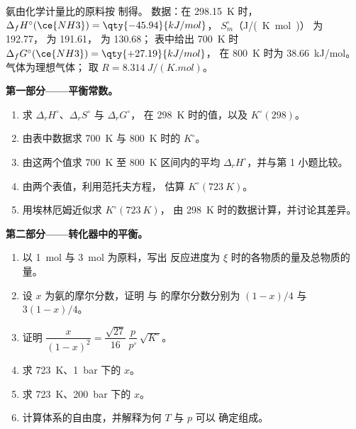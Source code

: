 \begin{problem}
\label{pb:b2:equilibrium-shifts:1}
氨由化学计量比的原料按  制得。
数据：在 \qty{298.15}{K} 时，$\Delta_f H^\circ(\ce{NH3}) = \qty{-45.94}{kJ/mol}$，
$S^\circ_m$（\unit{J/(K.mol)}） 为 192.77， 为 191.61， 为 130.68；
表中给出 \qty{700}{K} 时 $\Delta_f G^\circ(\ce{NH3}) = \qty{+27.19}{kJ/mol}$，
在 \qty{800}{K} 时为 \qty{+38.66}{kJ/mol}。气体为理想气体；
取 $R = \qty{8.314}{J/(K.mol)}$。

\medskip
\noindent\textbf{第一部分——平衡常数。}
\begin{enumerate}
  \item 求 $\Delta_r H^\circ$、$\Delta_r S^\circ$ 与 $\Delta_r G^\circ$，
        在 \qty{298}{K} 时的值，以及 $K^\circ(298)$。
  \item 由表中数据求 \qty{700}{K} 与 \qty{800}{K} 时的 $K^\circ$。
  \item 由这两个值求 \qty{700}{K} 至
        \qty{800}{K} 区间内的平均 $\Delta_r H^\circ$，并与第 1 小题比较。
  \item 由两个表值，利用范托夫方程，
        估算 $K^\circ(\qty{723}{K})$。
  \item 用埃林厄姆近似求 $K^\circ(\qty{723}{K})$，
        由 \qty{298}{K} 时的数据计算，并讨论其差异。
\end{enumerate}

\medskip
\noindent\textbf{第二部分——转化器中的平衡。}
\begin{enumerate}[resume]
  \item 以 \qty{1}{mol}  与 \qty{3}{mol}  为原料，写出
        反应进度为 $\xi$ 时的各物质的量及总物质的量。
  \item 设 $x$ 为氨的摩尔分数，证明
         与  的摩尔分数分别为 $(1-x)/4$ 与 $3(1-x)/4$。
  \item 证明 $\dfrac{x}{(1-x)^2} = \dfrac{\sqrt{27}}{16}\,\dfrac{p}{p^\circ}\,
        \sqrt{K^\circ}$。
  \item 求 \qty{723}{K}、\qty{1}{bar} 下的 $x$。
  \item 求 \qty{723}{K}、\qty{200}{bar} 下的 $x$。
  \item 计算体系的自由度，并解释为何 $T$ 与 $p$ 可以
        确定组成。
\end{enumerate}


\end{problem}
